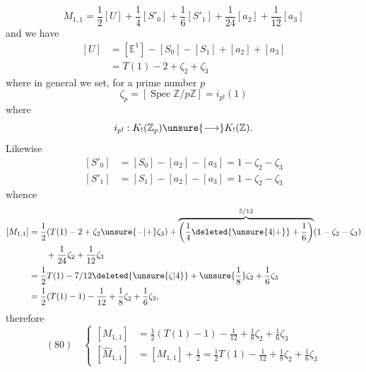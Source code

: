 \[
M_{1,1}=\frac12[U]+\frac14[S'_0]+\frac16[S'_1]+\frac1{24}[a_2]+\frac1{12}[a_3]
\]
and we have
\[
\begin{aligned}
[U]&=[\mathbb E^1]-[S_0]-[S_1]+[a_2]+[a_3]\\
&=T(1)-2+\zeta_2+\zeta_3
\end{aligned}
\]
where in general we set, for a prime number $p$
\[
\zeta_p=[\operatorname{Spec}\mathbb Z/p\mathbb Z]=i_{p!}(1)
\]
where
\[
i_{p!}:K_!(\mathbb Z_p)\unsure{\longrightarrow} K_!(\mathbb Z).
\]
Likewise
\[
\begin{aligned}
[S'_0]&=[S_0]-[a_2]-[a_3]=1-\zeta_2-\zeta_3\\
[S'_1]&=[S_1]-[a_2]-[a_3]=1-\zeta_2-\zeta_3
\end{aligned}
\]
whence
\[
\begin{aligned}
[M_{1,1}]&=\frac12(T(1)-2+\zeta_2\unsure{-|+}\zeta_3)+\overbrace{\left(\frac14\deleted{\unsure{4|+}}+\frac16\right)}^{5/12}(1-\zeta_2-\zeta_3)\\
&\qquad+\frac1{24}\zeta_2+\frac1{12}\zeta_3\\
&=\frac12T(1)-7/12\deleted{\unsure{\zeta|4}}+\unsure{\frac18}\zeta_2+\frac16\zeta_3\\
&=\frac12(T(1)-1)-\frac1{12}+\frac18\zeta_2+\frac16\zeta_3,
\end{aligned}
\]
therefore
\[
(80)\quad\left\{\begin{aligned}
[M_{1,1}]&=\frac12(T(1)-1)-\frac1{12}+\frac18\zeta_2+\frac16\zeta_3\\
[\widehat M_{1,1}]&=[M_{1,1}]+\frac12=\frac12T(1)-\frac1{12}+\frac18\zeta_2+\frac16\zeta_3
\end{aligned}\right.
\]
